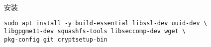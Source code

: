 
\begin{issues}
\issueDraft
\end{issues}

安装
\begin{lstlisting}[language=none]
sudo apt install -y build-essential libssl-dev uuid-dev \
libgpgme11-dev squashfs-tools libseccomp-dev wget \
pkg-config git cryptsetup-bin
\end{lstlisting}

